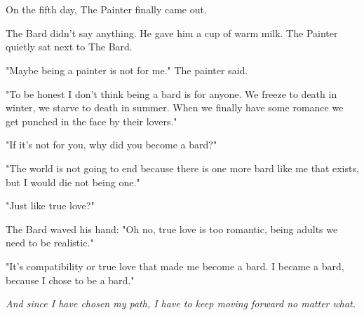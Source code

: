 \documentclass{article}
\begin{document}
\section{} %
\par On the fifth day, The Painter finally came out.
\par The Bard didn't say anything. He gave him a cup of warm milk. The Painter quietly sat next to The Bard.
\par "Maybe being a painter is not for me." The painter said.
\par "To be honest I don't think being a bard is for anyone. We freeze to death in winter, we starve to death in summer. When we finally have some romance we get punched in the face by their lovers."
\par "If it's not for you, why did you become a bard?"
\par "The world is not going to end because there is one more bard like me that exists, but I would die not being one."
\par "Just like true love?"
\par The Bard waved his hand: "Oh no, true love is too romantic, being adults we need to be realistic."
\par "It's compatibility or true love that made me become a bard.  I became a bard, because I chose to be a bard."
\par \textit{And since I have chosen my path, I have to keep moving forward no matter what.}
\end{document}
